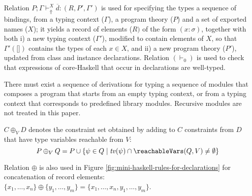 Relation $P;\Gamma \vdash_{\Uparrow}^X \overline{\!d}:(R,P',\Gamma')$
is used for specifying the types a sequence of bindings, from a typing
context ($\Gamma$), a program theory ($P$) and a set of exported names
($X$); it yields a record of elements ($R)$ of the form $(x:\sigma)$,
together with both i) a new typing context ($\Gamma'$), modified to
contain elements of $X$, so that $\Gamma'(\texttt{[]})$ contains the
types of each $x\in X$, and ii) a new program theory ($P'$), updated
from class and instance declarations.  Relation $(\vdash_0)$ is used
to check that expressions of core-Haskell that occur in declarations
are well-typed.


There must exist a sequence of derivations for typing a sequence of
modules that composes a program that starts from an empty typing
context, or from a typing context that corresponds to predefined
library modules. Recursive modules are not treated in this paper.

$C \oplus_V D$ denotes the constraint set obtained by adding to $C$
constraints from $D$ that have type variables reachable from $V$:
  \[ P \oplus_V Q = P \cup \{ \psi \in Q \mid \tv(\psi) \cap \reachableVars(Q,V) \not= \emptyset \} \]

Relation $\oplus$ is also used in Figure
\ref{fig:mini-haskell-rules-for-declarations} for concatenation of
record elements: $\{ x_1, \ldots, x_n \} \oplus \{ y_1, \ldots, y_m \}
= \{ x_1, \ldots, x_n, y_1, \ldots, y_m \}$.


